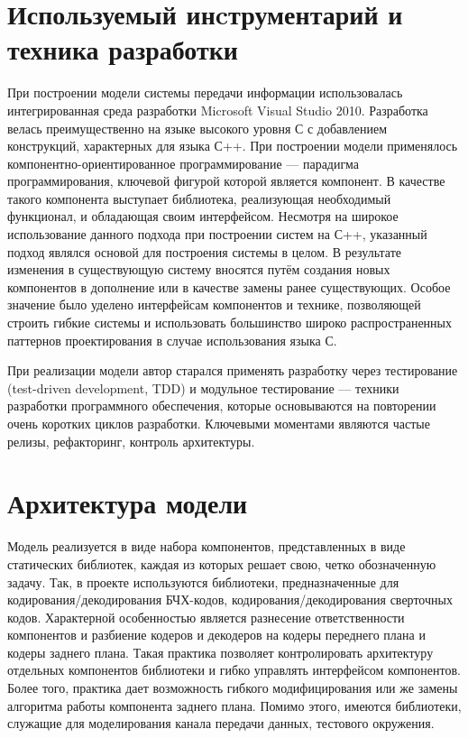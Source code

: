 \section{Используемый инcтрументарий и техника разработки}
При построении модели системы передачи информации использовалась интегрированная среда разработки Microsoft 
Visual Studio 2010. Разработка велась преимущественно на языке высокого уровня С с добавлением конструкций, 
характерных для языка С++. При построении модели применялось компонентно-ориентированное программирование --- 
парадигма программирования, ключевой фигурой которой является компонент. В качестве такого компонента 
выступает библиотека, реализующая необходимый функционал, и обладающая своим интерфейсом. Несмотря на широкое 
использование данного подхода при построении систем на С++, указанный подход являлся основой для построения 
системы в целом. В результате изменения в существующую систему вносятся путём создания новых компонентов в 
дополнение или в качестве замены ранее существующих. Особое значение было уделено интерфейсам компонентов и 
технике, позволяющей строить гибкие системы и использовать большинство широко распространенных паттернов 
проектирования в случае использования языка С.

При реализации модели автор старался применять разработку через тестирование (test-driven development, TDD) и 
модульное тестирование --- техники разработки программного обеспечения, которые основываются на повторении 
очень коротких циклов разработки. Ключевыми моментами являются частые релизы, рефакторинг, контроль 
архитектуры.

\section{Архитектура модели}
Модель реализуется в виде набора компонентов, представленных в виде статических библиотек, каждая из которых 
решает свою, четко обозначенную задачу. Так, в проекте используются библиотеки, предназначенные для 
кодирования/декодирования БЧХ-кодов, кодирования/декодирования сверточных кодов. Характерной особенностью 
является разнесение ответственности компонентов и разбиение кодеров и декодеров на кодеры переднего плана и 
кодеры заднего плана. Такая практика позволяет контролировать архитектуру отдельных компонентов библиотеки и 
гибко управлять интерфейсом компонентов. Более того, практика дает возможность гибкого модифицирования или же 
замены алгоритма работы компонента заднего плана. Помимо этого, имеются библиотеки, служащие для 
моделирования канала передачи данных, тестового окружения.
